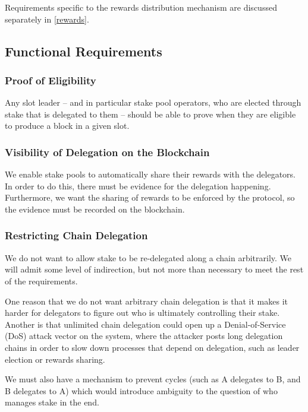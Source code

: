 \documentclass[11pt,a4paper]{article}
\begin{document}
Requirements specific to the rewards distribution mechanism are
discussed separately in \cref{rewards}.

\subsection{Functional Requirements}
\label{functional-requirements}

\subsubsection{Proof of Eligibility}
\label{proof-of-eligibility}

Any slot leader -- and in particular stake pool operators, who are
elected through stake that is delegated to them -- should be able to
prove when they are eligible to produce a block in a given slot.

\subsubsection{Visibility of Delegation on the Blockchain}
\label{visibility-of-delegation-on-the-blockchain}

We enable stake pools to automatically share their rewards with the
delegators. In order to do this, there must be evidence for the
delegation happening. Furthermore, we want the sharing of rewards to be
enforced by the protocol, so the evidence must be recorded on the
blockchain.

\subsubsection{Restricting Chain Delegation}
\label{restricting-chain-delegation}

We do not want to allow stake to be re-delegated along a chain
arbitrarily. We will admit some level of indirection, but not more than
necessary to meet the rest of the requirements.

One reason that we do not want arbitrary chain delegation is that it
makes it harder for delegators to figure out who is ultimately
controlling their stake. Another is that unlimited chain delegation
could open up a Denial-of-Service (DoS) attack vector on the system,
where the attacker posts long delegation chains in order to slow down
processes that depend on delegation, such as leader election or rewards
sharing.

We must also have a mechanism to prevent cycles (such as A delegates to
B, and B delegates to A) which would introduce ambiguity to the question
of who manages stake in the end.
\end{document}
